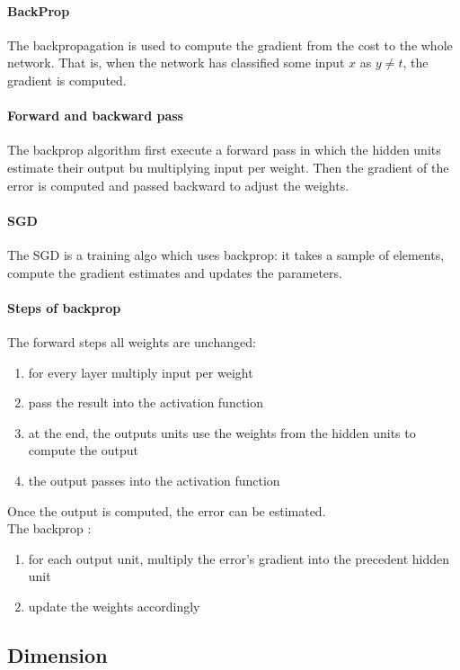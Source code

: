 \paragraph{BackProp}
The backpropagation is used to compute the gradient from the cost to the whole network. That is, when the network has  classified some input $x$ as $y\neq t$, the gradient is computed.

\paragraph{Forward and backward pass}
The backprop algorithm first execute a forward pass in which the hidden units estimate their output bu multiplying input per weight. Then the gradient of the error is computed and passed backward to adjust the weights.

\paragraph{SGD}
The SGD is a training algo which uses backprop: it takes a sample of elements, compute the gradient estimates and updates the parameters.

\paragraph{Steps of backprop}
The forward steps all weights are unchanged:
\begin{enumerate}
\item for every layer multiply input per weight
\item pass the result into the activation function
\item at the end, the outputs units use the weights from the hidden units to compute the output
\item the output passes into the activation function
\end{enumerate}
Once the output is computed, the error can be estimated.\\
The backprop :
\begin{enumerate}
\item for each output unit, multiply the error's gradient into the precedent hidden unit
\item update the weights accordingly
\end{enumerate}

\subsection{Dimension}

